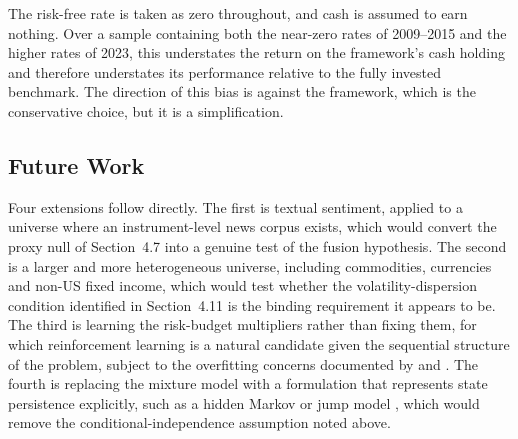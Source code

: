 The risk-free rate is taken as zero throughout, and cash is assumed to earn nothing.
Over a sample containing both the near-zero rates of 2009--2015 and the higher rates of
2023, this understates the return on the framework's cash holding and therefore
understates its performance relative to the fully invested benchmark. The direction of
this bias is against the framework, which is the conservative choice, but it is a
simplification.

\subsection{Future Work}
\label{sec:future}

Four extensions follow directly. The first is textual sentiment, applied to a universe
where an instrument-level news corpus exists, which would convert the proxy null of
Section~4.7 into a genuine test of the fusion hypothesis. The second is a larger and
more heterogeneous universe, including commodities, currencies and non-US fixed income,
which would test whether the volatility-dispersion condition identified in
Section~4.11 is the binding requirement it appears to be. The third is learning the
risk-budget multipliers rather than fixing them, for which reinforcement learning is a
natural candidate given the sequential structure of the problem, subject to the
overfitting concerns documented by \citet{harvey15} and \citet{valls26}. The fourth is
replacing the mixture model with a formulation that represents state persistence
explicitly, such as a hidden Markov or jump model \citep{li25}, which would remove the
conditional-independence assumption noted above.
